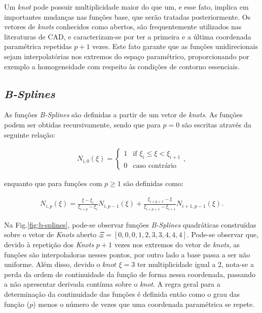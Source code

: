 \documentclass[tese_patricia]{subfiles}
\begin{document}
Um \textit{knot} pode possuir multiplicidade maior do que um, e esse fato, implica em importantes mudanças nas funções base, que serão tratadas posteriormente. Os vetores de \textit{knots} conhecidos como abertos, são frequentemente utilizados nas literaturas de CAD, e caracterizam-se por ter a primeira e a última coordenada paramétrica repetidas $p+1$ vezes. Este fato garante que as funções unidirecionais sejam interpolatórias nos extremos do espaço paramétrico, proporcionando por exemplo a homogeneidade com respeito às condições de contorno essenciais. 

\subsection{\textit{B-Splines}}

As funções \textit{B-Splines} são definidas a partir de um vetor de \textit{knots}.  As funções podem ser obtidas recursivamente, sendo que para $p=0$ são escritas através da seguinte relação:

\begin{align}
N_{i,0}(\xi) = \begin{cases} 1 &\mbox{if } \xi_i\leq\xi<\xi_{i+1} \\
0 & \mbox{caso contrário } \end{cases},
\end{align}

\noindent enquanto que para funções com $p\geq1$ são definidas como:

\begin{align}
N_{i,p}(\xi)=\frac{\xi-\xi_{i}}{\xi_{i+p}-\xi_{i}}N_{i,p-1}(\xi) + 
\frac{\xi_{i+p+1}-\xi}{\xi_{i+p+1}-\xi_{i+1}}N_{i+1,p-1}(\xi).
\end{align}

Na Fig.\ref{fig:b-splines}, pode-se observar funções \textit{B-Splines} quadráticas construídas sobre o vetor de \textit{Knots} aberto $\Xi=\left[0,0,0,1,2,3,3,4,4,4\right]$. Pode-se observar que, devido à repetição dos \textit{Knots}  $p+1$ vezes nos extremos do vetor de \textit{knots}, as funções são interpoladoras nesses pontos, por outro lado a base passa a ser não uniforme. Além disso, devido o $knot$ $\xi = 3$ ter multiplicidade igual a 2, nota-se a perda da ordem de continuidade da função de forma nessa coordenada, passando a não apresentar derivada contínua sobre o \textit{knot}. A regra geral para a determinação da continuidade das funções é definida então como o grau das função ($p$) menos o número de vezes que uma coordenada paramétrica se repete.
\end{document}
